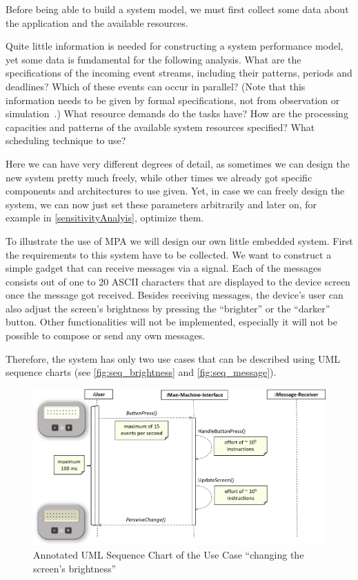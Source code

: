 \label{data}

Before being able to build a system model, we must first collect some data about the application and the available resources.


Quite little information is needed for constructing a system performance model, yet some data is fundamental for the following analysis.
What are the specifications of the incoming event streams, including their patterns, periods and deadlines?
Which of these events can occur in parallel?
(Note that this information needs to be given by formal specifications, not from observation or simulation~\cite{wan:06}.)
What resource demands do the tasks have?
How are the processing capacities and patterns of the available system resources specified?
What scheduling technique to use?

Here we can have very different degrees of detail, as sometimes we can design the new system pretty much freely, while other times we already got specific components and architectures to use given.
Yet, in case we can freely design the system, we can now just set these parameters arbitrarily and later on, for example in \autoref{sensitivityAnalyis}, optimize them.

To illustrate the use of MPA we will design our own little embedded system.
First the requirements to this system have to be collected.
We want to construct a simple gadget that can receive messages via a signal.
Each of the messages consists out of one to 20 ASCII characters that are displayed to the device screen once the message got received.
Besides receiving messages, the device's user can also adjust the screen's brightness by pressing the ``brighter'' or the ``darker'' button.
Other functionalities will not be implemented, especially it will not be possible to compose or send any own messages.

Therefore, the system has only two use cases that can be described using UML sequence charts (see \autoref{fig:seq_brightness} and \autoref{fig:seq_message}).

\begin{figure}
    \centering
    \includegraphics[width=\columnwidth]{graphics/sequence_brightness.png}
    \caption{Annotated UML Sequence Chart of the Use Case ``changing the screen's brightness''}\label{fig:seq_brightness}
\end{figure}

